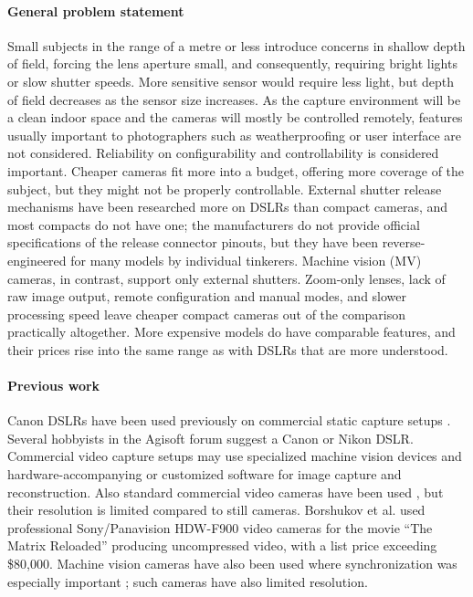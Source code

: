 \paragraph{General problem statement}
Small subjects in the range of a metre or less introduce concerns in shallow depth of field, forcing the lens aperture small, and consequently, requiring bright lights or slow shutter speeds.
More sensitive sensor would require less light, but depth of field decreases as the sensor size increases.
As the capture environment will be a clean indoor space and the cameras will mostly be controlled remotely, features usually important to photographers such as weatherproofing or user interface are not considered.
Reliability on configurability and controllability is considered important.
Cheaper cameras fit more into a budget, offering more coverage of the subject, but they might not be properly controllable.
External shutter release mechanisms have been researched more on DSLRs than compact cameras, and most compacts do not have one;
the manufacturers do not provide official specifications of the release connector pinouts, but they have been reverse-engineered for many models by individual tinkerers.
Machine vision (MV) cameras, in contrast, support only external shutters.
Zoom-only lenses, lack of raw image output, remote configuration and manual modes, and slower processing speed leave cheaper compact cameras out of the comparison practically altogether.
More expensive models do have comparable features, and their prices rise into the same range as with DSLRs that are more understood.

\paragraph{Previous work}
Canon DSLRs have been used previously on commercial static capture setups \cite{ir-ltd,ten24,capturelab,agisoftforum,winder2008technical}.
Several hobbyists in the Agisoft forum suggest a Canon or Nikon DSLR. \cite{agisoftforum}
Commercial video capture setups may use specialized machine vision devices and hardware-accompanying or customized software for image capture and reconstruction. \cite{al2013new}
Also standard commercial video cameras have been used \cite{bradley2010high}, but their resolution is limited compared to still cameras.
Borshukov et al. used professional Sony/Panavision HDW-F900 video cameras for the movie ``The Matrix Reloaded'' \cite{borshukov05universal} producing uncompressed video, with a list price exceeding \$80,000. \cite{sonyhdwf900r}
Machine vision cameras have also been used where synchronization was especially important \cite{carceroni2002multi,bickel2007multi}; such cameras have also limited resolution.

